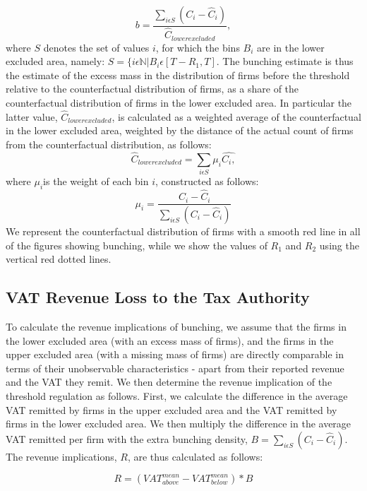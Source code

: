 \begin{equation}
b=\frac{\sum_{i\epsilon S}(C_{i}-\hat{C}_{i})}{\hat{C}_{lowerexcluded}},
\end{equation}
where $S$ denotes the set of values $i$, for which the bins $B_{i}$
are in the lower excluded area, namely: $S=\{i\epsilon\mathbb{N}|B_{i}\epsilon[T-R_{1},T]$.
The bunching estimate is thus the estimate of the excess mass in the
distribution of firms before the threshold relative to the counterfactual
distribution of firms, as a share of the counterfactual distribution
of firms in the lower excluded area. In particular the latter value,
$\hat{C}_{lowerexcluded}$, is calculated as a weighted average of
the counterfactual in the lower excluded area, weighted by the distance
of the actual count of firms from the counterfactual distribution,
as follows: 
\[
\hat{C}_{lowerexcluded}=\sum_{i\epsilon S}\mu_{i}\hat{C_{i},}
\]
where $\mu_{i}$is the weight of each bin $i$, constructed as follows:
\[
\mu_{i}=\frac{C_{i}-\hat{C}_{i}}{\sum_{i\epsilon S}(C_{i}-\hat{C}_{i})}
\]
We represent the counterfactual distribution of firms with a smooth
red line in all of the figures showing bunching, while we show the
values of $R_{1}$ and $R_{2}$ using the vertical red dotted lines.

\subsection{VAT Revenue Loss to the Tax Authority}
\label{subsec:methodology-revenue-loss}
To calculate the revenue implications of bunching, we assume that
the firms in the lower excluded area (with an excess mass of firms),
and the firms in the upper excluded area (with a missing mass of firms)
are directly comparable in terms of their unobservable characteristics
- apart from their reported revenue and the VAT they remit. We then
determine the revenue implication of the threshold regulation as follows.
First, we calculate the difference in the average VAT remitted by
firms in the upper excluded area and the VAT remitted by firms in
the lower excluded area. We then multiply the difference in the average
VAT remitted per firm with the extra bunching density, $B=\sum_{i\epsilon S}(C_{i}-\hat{C}_{i})$.
The revenue implications, $R$, are thus calculated as follows:

\begin{equation}
R=(VAT_{above}^{mean}-VAT_{below}^{mean})*B
\end{equation}


